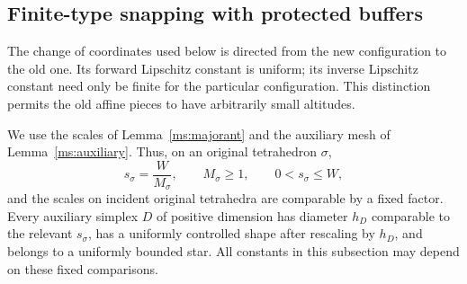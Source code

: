 \documentclass[11pt]{article}
\numberwithin{equation}{section}
\theoremstyle{definition}
\theoremstyle{remark}
\begin{document}
\subsection{Finite-type snapping with protected buffers}

The change of coordinates used below is directed from the new configuration
to the old one.  Its forward Lipschitz constant is uniform; its inverse
Lipschitz constant need only be finite for the particular configuration.
This distinction permits the old affine pieces to have arbitrarily small
altitudes.



We use the scales of Lemma~\ref{ms:majorant} and the auxiliary mesh of
Lemma~\ref{ms:auxiliary}.  Thus, on an original tetrahedron $\sigma$,
\[
 s_\sigma=\frac{W}{M_\sigma},\qquad M_\sigma\geq 1,
 \qquad 0<s_\sigma\leq W,
\]
and the scales on incident original tetrahedra are comparable by a fixed
factor.  Every auxiliary simplex $D$ of positive dimension has diameter
$h_D$ comparable to the relevant $s_\sigma$, has a uniformly controlled
shape after rescaling by $h_D$, and belongs to a uniformly bounded star.
All constants in this subsection may depend on these fixed comparisons.
\end{document}
